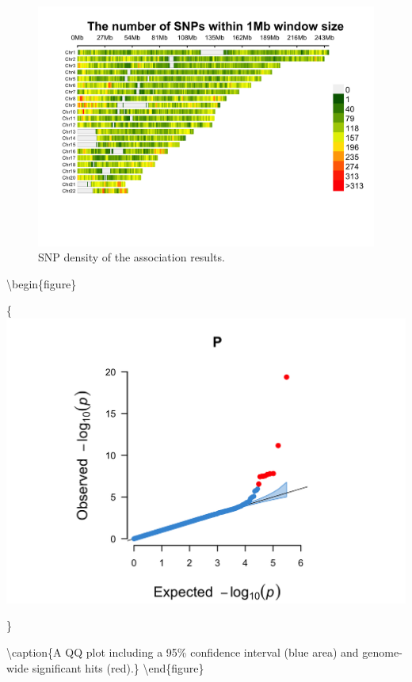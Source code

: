 \documentclass[
]{book}
\begin{document}
\begin{figure}

{\centering \includegraphics[width=18.67in]{img/_gwas/show-cmplot-all-density} 

}

\caption{SNP density of the association results.}\label{fig:show-cmplot-all-density}
\end{figure}

\textbackslash begin\{figure\}

\{\centering \includegraphics[width=18.67in]{img/_gwas/show-cmplot-all-qq}

\}

\textbackslash caption\{A QQ plot including a 95\% confidence interval (blue area) and genome-wide significant hits (red).\}\label{fig:show-cmplot-all-qq}
\textbackslash end\{figure\}
\end{document}
